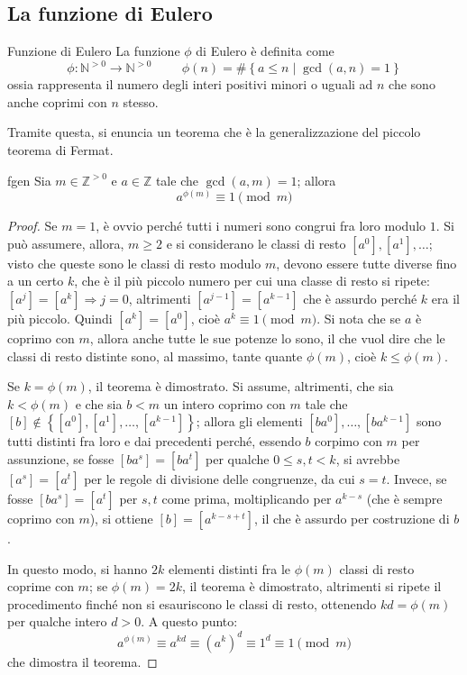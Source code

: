 \documentclass[11pt, a4paper]{scrartcl}
\theoremstyle{definition}
\numberwithin{esempio}{section}
\theoremstyle{definition}
\numberwithin{obs}{section}
\numberwithin{nota}{section}
\numberwithin{equation}{subsection}
\begin{document}
\subsection{La funzione di Eulero}
\begin{definizione}
	{Funzione di Eulero}{}
	La funzione $\phi $ di Eulero \`e definita come
	\[
		\phi : \mathbb{N}^{>0} \to \mathbb{N}^{>0} \hspace{1cm} \phi (n) = \# \left\{ a \le n  \mid \operatorname{gcd}(a,n) =1 \right\} 
	\] 
	ossia rappresenta il numero degli interi positivi minori o uguali ad $n$ che sono anche coprimi con $n$ stesso.
\end{definizione}
\noindent Tramite questa, si enuncia un teorema che \`e la generalizzazione del piccolo teorema di Fermat.
\begin{teorema}
	{}{fgen}
	Sia $m \in \mathbb{Z}^{>0} $ e $a \in \mathbb{Z}$ tale che $\operatorname{gcd}(a,m) = 1$; allora
	\[
	a^{\phi (m)} \equiv 1 \pmod{m} 
	\] 
\begin{proof}
	Se $m=1$, \`e ovvio perch\'e tutti i numeri sono congrui fra loro modulo $1$.
	Si pu\`o assumere, allora, $m\ge 2 $ e si considerano le classi di resto $[a^0], [a^1], \ldots$; visto che queste sono le classi di resto modulo $m$, devono essere tutte diverse fino a un certo $k$, che \`e il pi\`u piccolo numero per cui una classe di resto si ripete: $[a^j] = [a^k]\Rightarrow j=0$, altrimenti $[a^{j-1} ] = [a^{k-1} ]$ che \`e assurdo perch\'e $k$ era il pi\`u piccolo.
	Quindi $[a^k] = [a^0]$, cio\`e $a^k\equiv 1\pmod{m} $.
	Si nota che se $a$ \`e coprimo con $m$, allora anche tutte le sue potenze lo sono, il che vuol dire che le classi di resto distinte sono, al massimo, tante quante $\phi (m)$, cio\`e $k\le \phi (m)$.

	Se $k=\phi (m)$, il teorema \`e dimostrato.
	Si assume, altrimenti, che sia $k<\phi (m)$ e che sia $b<m$ un intero coprimo con $m$ tale che $[b]\not \in \left\{ [a^0], [a^1], \ldots, [a^{k-1} ] \right\} $; allora gli elementi $[ba^0], \ldots, [ba^{k-1} ]$ sono tutti distinti fra loro e dai precedenti perch\'e, essendo $b$ corpimo con $m$ per assunzione, se fosse $[ba^s] = [ba^t] $ per qualche $0\le s,  t<k$, si avrebbe $[a^s]=[a^t]$ per le regole di divisione delle congruenze, da cui $s=t$.
	Invece, se fosse $[ba^s] = [a^t]$ per $s,t$ come prima, moltiplicando per $a^{k-s} $ (che \`e sempre coprimo con $m$), si ottiene $[b] = [a^{k-s+t} ]$, il che \`e assurdo per costruzione di $b$.

	In questo modo, si hanno $2k$ elementi distinti fra le $\phi (m)$ classi di resto coprime con $m$; se $\phi (m) = 2k$, il teorema \`e dimostrato, altrimenti si ripete il procedimento finch\'e non si esauriscono le classi di resto, ottenendo $kd = \phi (m)$ per qualche intero $d > 0$.
A questo punto: 
\[
a^{\phi (m)} \equiv a^{kd} \equiv (a^k)^d \equiv 1^d \equiv 1 \pmod{m} 
\] 
che dimostra il teorema.
\end{proof}	
\end{teorema}
\end{document}

